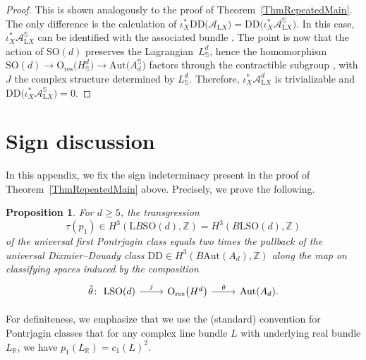 \documentclass[10pt,a4paper]{amsart}
\numberwithin{equation}{section}
\newtheorem{Proposition}[Theorem]{Proposition}
\newcommand{\R}{\mathbb{R}}
\newcommand{\Z}{\mathbb{Z}}
\newcommand{\SO}{\mathrm{SO}}
\newcommand{\res}{\mathrm{res}}
\newcommand{\Aut}{\mathrm{Aut}}
\newcommand{\U}{\mathrm{U}}
\renewcommand{\O}{\mathrm{O}}
\renewcommand{\L}{\mathrm{L}}
\newcommand{\DD}{\mathrm{DD}}
\begin{document}
\begin{proof}
This is shown analogously to the proof of Theorem~\ref{ThmRepeatedMain}.
The only difference is the calculation of $\iota_X^* \DD\big(\mathcal{A}_{\L X}\big) = \DD\big(\iota_X^*\mathcal{A}_{\L X}^{\mathbb{S}}\big)$.
In this case, $\iota_X^*\mathcal{A}_{\L X}^{\mathbb{S}}$ can be identified with the associated bundle \smash{$\SO(X) \times_{\SO(d)} A_d^{\mathbb{S}}$}.
The point is now that the action of $\SO(d)$ preserves the Lagrangian~$L^d_{\mathbb{S}}$, hence the homomorphism $\SO(d) \to \O_{\res}\big(H^d_{\mathbb{S}}\big) \to \Aut\big(A_d^{\mathbb{S}}\big)$ factors through the contractible subgroup \smash{$\U\big(\big(H^d_{\mathbb{S}}\big)_J\big)$}, with $J$ the complex structure determined by $L^d_{\mathbb{S}}$.
Therefore, ${\iota_X^*\mathcal{A}_{\L X}^d}$ is trivializable and $\DD\big(\iota_X^*\mathcal{A}_{\L X}^{\mathbb{S}}\big)=0$.
\end{proof}

\appendix

\section{Sign discussion}
\label{AppendixSign}

In this appendix, we fix the sign indeterminacy present in the proof of Theorem~\ref{ThmRepeatedMain} above.
Precisely, we prove the following.

\begin{Proposition}
\label{SignProposition}
For $d\geq 5$, the transgression
\begin{equation*}
\tau(p_1) \in H^3(\L B\SO(d), \Z) = H^3(B\L\SO(d), \Z)
\end{equation*}
of the universal first Pontrjagin class equals two times the pullback of the universal Dixmier--Douady class $\DD \in H^3(B\Aut(A_d), \Z)$ along the map on classifying spaces induced by the composition
\begin{equation*}
\begin{tikzcd}
\tilde{\theta} \colon\ \L\SO(d) \ar[r, "j"] & \O_{\mathrm{res}}\big(H^d\big) \ar[r, "\theta"] & \Aut(A_d).
\end{tikzcd}
\end{equation*}
\end{Proposition}

For definiteness, we emphasize that we use the (standard) convention for Pontrjagin classes that for any complex line bundle $L$ with underlying real bundle $L_\R$, we have $p_1(L_\R) = c_1(L)^2$.
\end{document}
